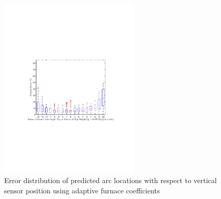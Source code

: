 \documentclass[onehalf,11pt]{beavtex}
\begin{document}
\begin{figure}[htbp]
	\centering
	\includegraphics[width=0.6\textwidth]{variable_furnace_coef_sensorheight_error.pdf}
	\caption{Error distribution of predicted arc locations with respect to vertical sensor position using adaptive furnace coefficients}
	\label{fig:vavg_error}
\end{figure}
\end{document}
